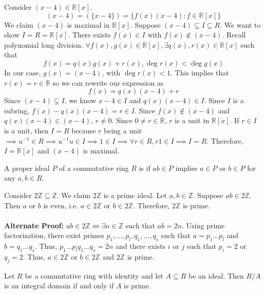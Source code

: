 \documentclass{mathnotes}
\begin{document}
\begin{ex}
  Consider $(x-4)\in\mathbb{R}[x]$.
  $$(x-4)=(\{x-4\})=\{f(x)(x-4):f\in\mathbb{R}[x]\}$$
  We claim $(x-4)$ is maximal in $\mathbb{R}[x]$. Suppose $(x-4)\subsetneq
  I\subseteq R$. We want to show $I=R=\mathbb{R}[x]$. There exists $f(x)\in I$
  with $f(x)\notin(x-4)$. Recall polynomial long division. $\forall
  f(x),g(x)\in\mathbb{R}[x],\exists q(x),r(x)\in\mathbb{R}[x]$ such that
  $$f(x)=q(x)g(x)+r(x),\deg r(x)<\deg g(x)$$
  In our case, $g(x)=(x-4)$, with $\deg r(x)<1$. This implies that
  $r(x)=r\in\mathbb{R}$ so we can rewrite our expression as
  $$f(x)=q(x)(x-4)+r$$
  Since $(x-4)\subsetneq I$, we know $x-4\in I$ and $q(x)(x-4)\in I$. Since $I$
  is a subring, $f(x)-q(x)(x-4)=r\in I$. Since $f(x)\notin(x-4)$ and
  $q(x)(x-4)\in(x-4)$, $r\ne0$. Since $0\ne r\in\mathbb{R}$, $r$ is a unit in
  $\mathbb{R}[x]$. If $r\in I$ is a unit, then $I=R$ because $r$ being a unit
  $\implies u^{-1}\in R\implies u^{-1}u\in I\implies1\in I\implies\forall r\in
  R, r1\in I\implies I=R$. Therefore, $I=\mathbb{R}[x]$ and $(x-4)$ is maximal.
\end{ex}

\begin{defi}
  A proper ideal $P$ of a commutative ring $R$ is  if $ab\in P$
  implies $a\in P$ or $b\in P$ for any $a,b\in R$.
\end{defi}

\begin{ex}
  Consider $2\mathbb{Z}\subseteq\mathbb{Z}$. We claim $2\mathbb{Z}$ is a prime
  ideal. Let $a,b\in\mathbb{Z}$. Suppose $ab\in2\mathbb{Z}$. Then $a$ or $b$ is
  even, i.e. $a\in2\mathbb{Z}$ or $b\in2\mathbb{Z}$. Therefore, $2\mathbb{Z}$
  is prime.\\\\
  \textbf{Alternate Proof:} $ab\in2\mathbb{Z}\Leftrightarrow\exists
  n\in\mathbb{Z}$ such that $ab=2n$. Using prime factorization, there exist
  primes $p_1,\ldots,p_l,q_1,\ldots,q_s$ such that $a=p_1\ldots p_l$ and
  $b=q_1\ldots q_s$. Thus, $p_1\ldots p_lq_1\ldots q_s=2n$ and there exists $i$
  or $j$ such that $p_i=2$ or $q_j=2$. Thus, $a\in2\mathbb{Z}$ or
  $b\in2\mathbb{Z}$ and $2\mathbb{Z}$ is prime.
\end{ex}

\begin{bthm}
  Let $R$ be a commutative ring with identity and let $A\subseteq R$ be an
  ideal. Then $R/A$ is an integral domain if and only if $A$ is prime.
\end{bthm}
\end{document}
